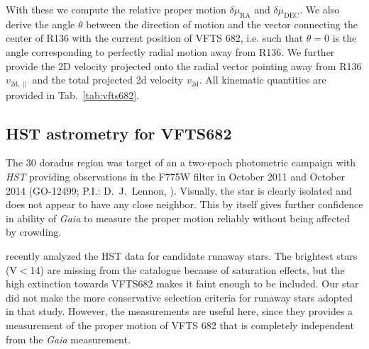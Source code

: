 \documentclass[apjl,twocolumn]{emulateapj}
\newcommand{\SdM}[1]{{{\color{brown}{#1}}}}
\begin{document}
With these we compute the relative proper motion
$\delta\mu_\mathrm{RA}$ and $\delta\mu_\mathrm{DEC}$.  We also derive
the angle $\theta$ between the direction of motion and the vector
connecting the center of R136 with the current position of VFTS 682,
i.e. such that $\theta = 0$ is the angle corresponding to perfectly
radial motion away from R136.    We further provide the 2D velocity
projected onto the radial vector pointing away from R136
$v_\mathrm{2d, \parallel}$  and the total projected 2d velocity
$v_\mathrm{2d}$.   All kinematic quantities are provided in
Tab.~\ref{tab:vfts682}. %



\subsection{HST astrometry for VFTS682}


The 30 doradus region was target of an a two-epoch photometric campaign with \emph{HST} providing observations in the F775W filter in October 2011 and October 2014 (GO-12499; P.I.: D.~J.~Lennon, \citealt{sabbi:13}). Visually, the star is clearly isolated and does not appear to have any close neighbor. This by itself gives further confidence in ability of \emph{Gaia} to measure the proper motion reliably without being affected by crowding. 


 \citet{platais:18} recently analyzed the HST data for candidate runaway stars. The brightest stars (V$<$14) are missing from the catalogue because of saturation effects, but the high extinction towards VFTS682 makes it faint enough to be included.
 Our star did not make the more conservative selection criteria for runaway stars adopted in that study. However, the measurements are useful here, since they provides a measurement of the proper motion of VFTS 682 that is completely independent from the \emph{Gaia} measurement. 
 
\end{document}
